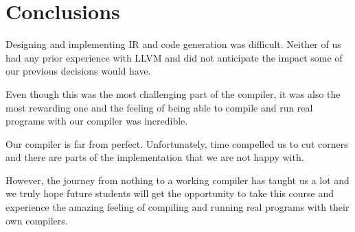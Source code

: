 \section{Conclusions}

Designing and implementing IR and code generation was difficult. Neither of us had any prior experience with LLVM and did not anticipate the impact some of our previous decisions would have.

Even though this was the most challenging part of the compiler, it was also the most rewarding one and the feeling of being able to compile and run real programs with our compiler was incredible.

Our compiler is far from perfect. Unfortunately, time compelled us to cut corners and there are parts of the implementation that we are not happy with.

However, the journey from nothing to a working compiler has taught us a lot and we truly hope future students will get the opportunity to take this course and experience the amazing feeling of compiling and running real programs with their own compilers.

